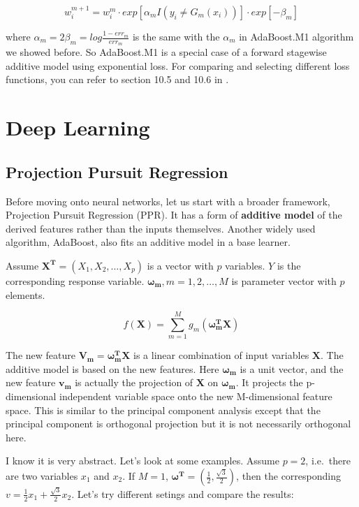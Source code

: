 \documentclass[12pt,]{krantz}
\begin{document}
\[w_i^{m+1}=w_i^m \cdot exp[\alpha_mI(y_i\neq G_m(x_i))] \cdot exp[-\beta_m]\]

where \(\alpha_m=2\beta_m=log\frac{1-err_m}{err_m}\) is the same with the \(\alpha_m\) in AdaBoost.M1 algorithm we showed before. So AdaBoost.M1 is a special case of a forward stagewise additive model using exponential loss. For comparing and selecting different loss functions, you can refer to section 10.5 and 10.6 in \citep{Hastie2008}.

\hypertarget{deep-learning}{%
\chapter{Deep Learning}\label{deep-learning}}

\hypertarget{projection-pursuit-regression}{%
\section{Projection Pursuit Regression}\label{projection-pursuit-regression}}

Before moving onto neural networks, let us start with a broader framework, Projection Pursuit Regression (PPR). It has a form of \textbf{additive model} of the derived features rather than the inputs themselves. Another widely used algorithm, AdaBoost, also fits an additive model in a base learner.

Assume \(\mathbf{X^{T}}=(X_1,X_2,\dots,X_p)\) is a vector with \(p\) variables. \(Y\) is the corresponding response variable. \(\mathbf{\omega_{m}},m=1,2,\dots,M\) is parameter vector with \(p\) elements.

\[f(\mathbf{X})=\sum_{m=1}^{M}g_{m}(\mathbf{\omega_{m}^{T}X})\]

The new feature \(\mathbf{V_{m}}=\mathbf{\omega_{m}^{T}X}\) is a linear combination of input variables \(\mathbf{X}\). The additive model is based on the new features. Here \(\mathbf{\omega_{m}}\) is a unit vector, and the new feature \(\mathbf{v_m}\) is actually the projection of \(\mathbf{X}\) on \(\mathbf{\omega_{m}}\). It projects the p-dimensional independent variable space onto the new M-dimensional feature space. This is similar to the principal component analysis except that the principal component is orthogonal projection but it is not necessarily orthogonal here.

I know it is very abstract. Let's look at some examples. Assume \(p=2\), i.e.~there are two variables \(x_1\) and \(x_2\). If \(M=1\), \(\mathbf{\omega^{T}}=(\frac{1}{2},\frac{\sqrt{3}}{2})\), then the corresponding \(v=\frac{1}{2}x_{1}+\frac{\sqrt{3}}{2}x_{2}\). Let's try different setings and compare the results:
\end{document}
